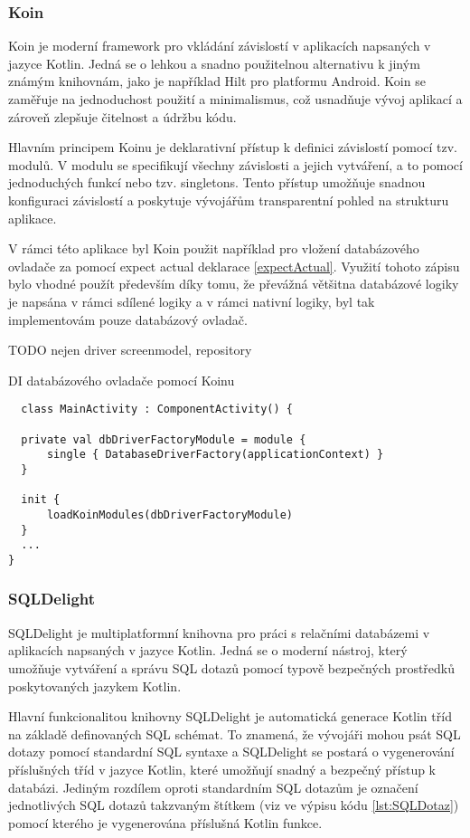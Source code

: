 \subsubsection*{Koin}
Koin je moderní framework pro vkládání závislostí v aplikacích napsaných v jazyce Kotlin. Jedná se o lehkou a snadno použitelnou alternativu 
k jiným známým knihovnám, jako je například Hilt pro platformu Android. Koin se zaměřuje na jednoduchost použití a minimalismus, což usnadňuje 
vývoj aplikací a zároveň zlepšuje čitelnost a údržbu kódu.

Hlavním principem Koinu je deklarativní přístup k definici závislostí pomocí tzv. modulů. V modulu se specifikují všechny závislosti a 
jejich vytváření, a to pomocí jednoduchých funkcí nebo tzv. singletons. Tento přístup umožňuje snadnou konfiguraci závislostí a poskytuje
 vývojářům transparentní pohled na strukturu aplikace.

\bigskip

V rámci této aplikace byl Koin použit například pro vložení databázového ovladače za pomocí expect actual deklarace \ref{expectActual}.
Využití tohoto zápisu bylo vhodné použít především díky tomu, že převážná většitna databázové logiky je napsána v rámci sdílené 
logiky a v rámci nativní logiky, byl tak implementovám pouze databázový ovladač.

TODO nejen driver screenmodel, repository
\begin{listing}[H]
\caption{DI databázového ovladače pomocí Koinu}\label{lst:KoinInit}
\begin{verbatim}
  class MainActivity : ComponentActivity() {

  private val dbDriverFactoryModule = module {
      single { DatabaseDriverFactory(applicationContext) }
  }

  init {
      loadKoinModules(dbDriverFactoryModule)
  }
  ...
}
\end{verbatim}
\end{listing}

\subsubsection*{SQLDelight}
SQLDelight je multiplatformní knihovna pro práci s relačními databázemi v aplikacích napsaných v jazyce Kotlin. Jedná se o moderní nástroj, 
který umožňuje vytváření a správu SQL dotazů pomocí typově bezpečných prostředků poskytovaných jazykem Kotlin.

Hlavní funkcionalitou knihovny SQLDelight je automatická generace Kotlin tříd na základě definovaných SQL schémat. To znamená, že vývojáři
 mohou psát SQL dotazy pomocí standardní SQL syntaxe a SQLDelight se postará o vygenerování příslušných tříd v jazyce Kotlin, které umožňují 
 snadný a bezpečný přístup k databázi. Jediným rozdílem oproti standardním SQL dotazům je označení jednotlivých SQL dotazů takzvaným 
 štítkem (viz  ve výpisu kódu \ref{lst:SQLDotaz}) pomocí kterého je vygenerována příslušná Kotlin funkce. 


